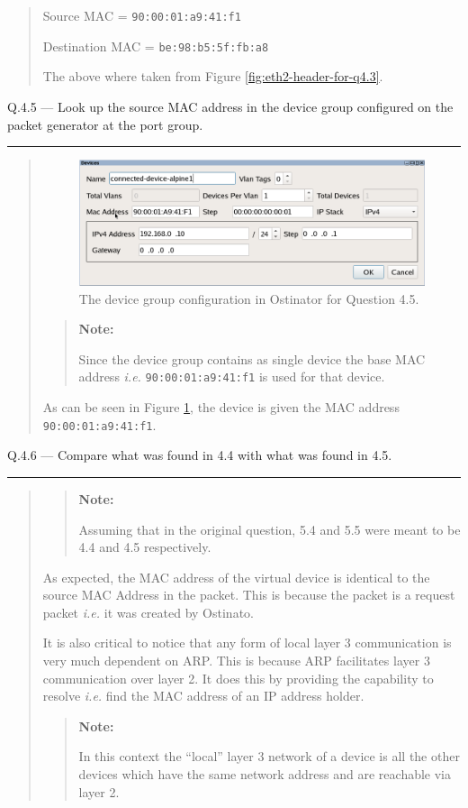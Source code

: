 \documentclass{article}
\newcommand\Que[2]{%
\begin{samepage}
\leavevmode\par
\noindent
Q.#1 --- #2\par\vspace{10pt}\hrule\vspace{10pt}
\end{samepage}}
\newenvironment{ans}
{\fbox{Answer}\begin{quote}\nopagebreak}
{\end{quote}}
\newcommand\ie{\emph{i.e.}}
\newenvironment{note}{%
\begin{quote}
\begin{tcolorbox}[colback=gray!10,arc=0mm,boxrule=0pt]
\raggedright
\textbf{Note:}%
}{%
\end{tcolorbox}
\end{quote}%
}
\begin{document}
\begin{ans}
Source MAC = \texttt{90:00:01:a9:41:f1}

Destination MAC = \texttt{be:98:b5:5f:fb:a8}

The above where taken from Figure
\ref{fig:eth2-header-for-q4.3}.
\end{ans}

\Que{4.5}{Look up the source MAC address in the device group
configured on the packet generator at the port group.}

\begin{ans}
\begin{figure}[H]
\centering
\includegraphics[width=14cm]{data/q4.5-device-group-config.png}
\caption{The device group configuration in Ostinator for
Question 4.5.}
\label{fig:devic-config-q4.5}
\end{figure}
\begin{note}
Since the device group contains as single device the
base MAC address \ie{} \texttt{90:00:01:a9:41:f1} is used for that
device.
\end{note}

As can be seen in Figure \ref{fig:devic-config-q4.5}, the
device is given the MAC address \texttt{90:00:01:a9:41:f1}.
\end{ans}

\Que{4.6}{Compare what was found in 4.4 with what was found in
4.5.}
\begin{ans}
\begin{note}
Assuming that in the original question, 5.4 and 5.5 were
meant to be 4.4 and 4.5 respectively.
\end{note}

As expected, the MAC address of the virtual device is
identical to the source MAC Address in the packet. This is
because the packet is a request packet \ie{} it was created
by Ostinato.

It is also critical to notice that any form of local layer 3
communication is very much dependent on ARP. This is because ARP
facilitates layer 3 communication over layer 2. It does this by
providing the capability to resolve \ie{} find the MAC address
of an IP address holder.

\begin{note}
In this context the ``local'' layer 3 network of a device is all
the other devices which have the same network address and are
reachable via layer 2.
\end{note}
\end{ans}
\end{document}
